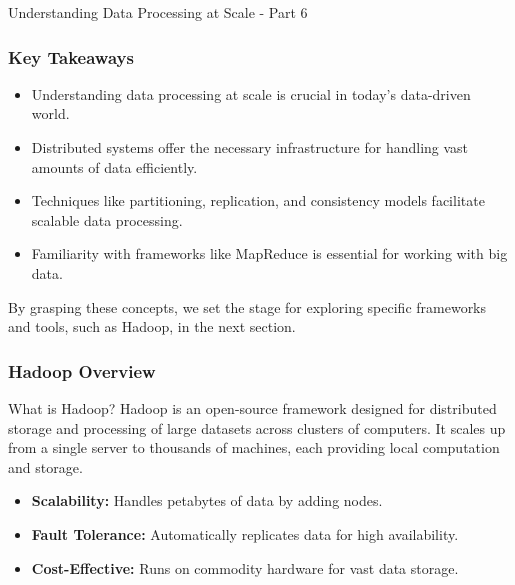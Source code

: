 \documentclass[aspectratio=169]{beamer}
\begin{document}
\begin{frame}[fragile]{Understanding Data Processing at Scale - Part 6}
    \frametitle{Key Takeaways}
    \begin{itemize}
        \item Understanding data processing at scale is crucial in today's data-driven world.
        \item Distributed systems offer the necessary infrastructure for handling vast amounts of data efficiently.
        \item Techniques like partitioning, replication, and consistency models facilitate scalable data processing.
        \item Familiarity with frameworks like MapReduce is essential for working with big data.
    \end{itemize}
    By grasping these concepts, we set the stage for exploring specific frameworks and tools, such as Hadoop, in the next section.
\end{frame}

\begin{frame}[fragile]
    \frametitle{Hadoop Overview}
    \begin{block}{What is Hadoop?}
        Hadoop is an open-source framework designed for distributed storage and processing of large datasets across clusters of computers. It scales up from a single server to thousands of machines, each providing local computation and storage.
    \end{block}
    
    \begin{itemize}
        \item \textbf{Scalability:} Handles petabytes of data by adding nodes.
        \item \textbf{Fault Tolerance:} Automatically replicates data for high availability.
        \item \textbf{Cost-Effective:} Runs on commodity hardware for vast data storage.
    \end{itemize}
\end{frame}
\end{document}
